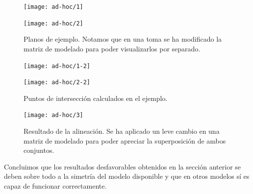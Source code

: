 \begin{figure}[h!]
	\begin{minipage}{0.5\textwidth}
		\centering
		\texttt{[image: ad-hoc/1]} 
	\end{minipage}
	\begin{minipage}{0.5\textwidth}
		\centering
		\texttt{[image: ad-hoc/2]} 
	\end{minipage}
	\caption{Planos de ejemplo. Notamos que en una toma se ha modificado la matriz de modelado\footnotemark \hspace{0.5mm}  para poder visualizarlos por separado.}
	\label{fig:ad-hoc}
\end{figure}
\begin{figure}[h!]
	\begin{minipage}{0.5\textwidth}
		\centering
		\texttt{[image: ad-hoc/1-2]} 
	\end{minipage}
	\begin{minipage}{0.5\textwidth}
		\centering
		\texttt{[image: ad-hoc/2-2]} 
	\end{minipage}
	\caption{Puntos de intersección calculados en el ejemplo.}
	\label{fig:ad-hoc2}
\end{figure}

\begin{figure}[bt]
		\centering
		\texttt{[image: ad-hoc/3]} 
	\caption{Resultado de la alineación. Se ha aplicado un leve cambio en una matriz de modelado para poder apreciar la superposición de ambos conjuntos.}
	\label{fig:ad-hoc3}
\end{figure}

Concluimos que los resultados desfavorables obtenidos en la sección anterior se deben sobre todo a la simetría del modelo disponible y que en otros modelos sí es capaz de funcionar correctamente.
